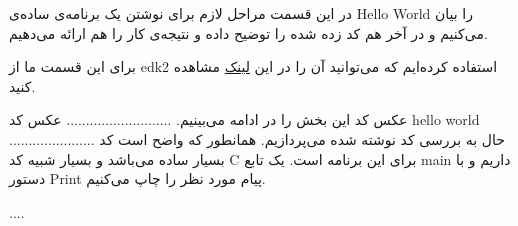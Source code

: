

در این قسمت مراحل لازم برای نوشتن یک برنامه‌ی ساده‌ی Hello World را بیان می‌کنیم و در آخر هم کد زده شده را توضیح داده و نتیجه‌ی کار را هم ارائه می‌دهیم.


برای این قسمت ما از edk2 استفاده کرده‌ایم که می‌توانید آن را در این \href{https://github.com/tianocore/edk2}{لینک} مشاهده کنید.


عکس کد این بخش را در ادامه می‌بینیم.
........................... عکس کد hello world ......................
حال به بررسی کد نوشته شده می‌پردازیم. همانطور که واضح است کد بسیار ساده می‌باشد و بسیار شبیه کد C برای این برنامه است. یک تابع main داریم و با دستور Print پیام مورد نظر را چاپ می‌کنیم.


....